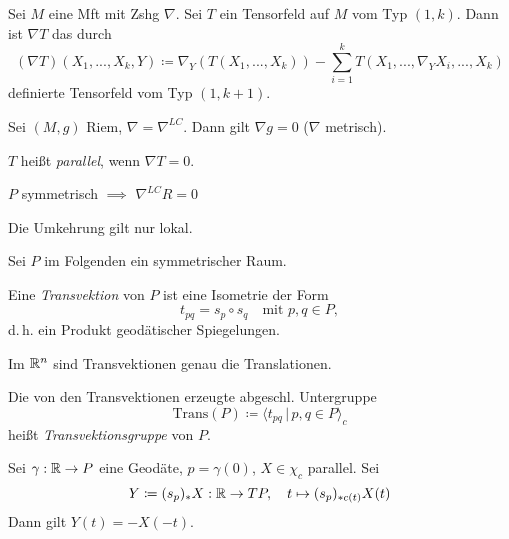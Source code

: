 \documentclass{cheat-sheet}
\newcommand{\Trans}{\mathrm{Trans}} %
\begin{document}
\begin{defn}
  Sei $M$ eine Mft mit Zshg $\nabla$. Sei $T$ ein Tensorfeld auf $M$ vom Typ $(1,k)$. Dann ist $\nabla T$ das durch
  \[
    (\nabla T)(X_1, ..., X_k, Y) \coloneqq \nabla_Y(T(X_1, ..., X_k)) - \sum_{i=1}^k T(X_1, ..., \nabla_Y X_i, ..., X_k)
  \]
  definierte Tensorfeld vom Typ $(1, k+1)$.
\end{defn}

\begin{bsp}
  Sei $(M, g)$ Riem, $\nabla = \nabla^{LC}$. Dann gilt $\nabla g = 0$ ($\nabla$ metrisch).
\end{bsp}

\begin{defn}
  $T$ heißt \emph{parallel}, wenn $\nabla T = 0$.
\end{defn}

\begin{satz}
  $P$ symmetrisch $\implies$ $\nabla^{LC} R = 0$
\end{satz}

\begin{bem}
  Die Umkehrung gilt nur lokal.
\end{bem}



\begin{nota}
  Sei $P$ im Folgenden ein symmetrischer Raum.
\end{nota}

\begin{defn}
  Eine \emph{Transvektion} von $P$ ist eine Isometrie der Form
  \[ t_{pq} = s_p \circ s_q \quad \text{mit } p, q \in P, \]
  d.\,h. ein Produkt geodätischer Spiegelungen.
\end{defn}

\begin{bsp}
  Im $\mathbb{R}^n$ sind Transvektionen genau die Translationen.
\end{bsp}

\begin{defn}
  Die von den Transvektionen erzeugte abgeschl. Untergruppe
  \[ \Trans(P) \coloneqq \langle t_{pq} \,|\, p, q \in P \rangle_{c} \]
  heißt \emph{Transvektionsgruppe} von $P$.
\end{defn}

\begin{lem}
  Sei $\gamma : \mathbb{R} \to P$ eine Geodäte, $p = \gamma(0)$, $X \in \chi_c$ parallel. Sei
  \[
    Y \coloneqq (s_p)_* X : \mathbb{R} \to TP, \quad
    t \mapsto (s_p)_{*c(t)} X(t)
  \]
  Dann gilt $Y(t) = -X(-t)$.
\end{lem}
\end{document}
